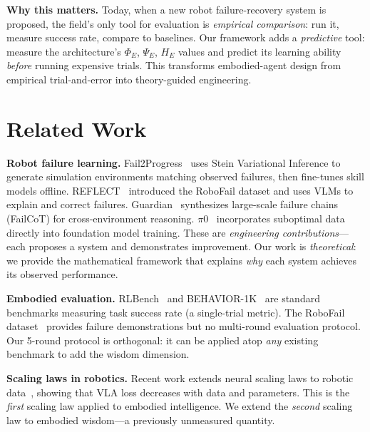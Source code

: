 \documentclass{article}
\begin{document}
\textbf{Why this matters.}
Today, when a new robot failure-recovery system is proposed, the field's only tool for evaluation is \emph{empirical comparison}: run it, measure success rate, compare to baselines.
Our framework adds a \emph{predictive} tool: measure the architecture's $\Phi_E$, $\Psi_E$, $H_E$ values and predict its learning ability \emph{before} running expensive trials.
This transforms embodied-agent design from empirical trial-and-error into theory-guided engineering.

\section{Related Work}
\label{sec:related}

\textbf{Robot failure learning.}
Fail2Progress~\citep{huang2025fail2progress} uses Stein Variational Inference to generate simulation environments matching observed failures, then fine-tunes skill models offline.
REFLECT~\citep{liu2023reflect} introduced the RoboFail dataset and uses VLMs to explain and correct failures.
Guardian~\citep{guardian2026} synthesizes large-scale failure chains (FailCoT) for cross-environment reasoning.
$\pi$0~\citep{pi07_2026} incorporates suboptimal data directly into foundation model training.
These are \emph{engineering contributions}---each proposes a system and demonstrates improvement.
Our work is \emph{theoretical}: we provide the mathematical framework that explains \emph{why} each system achieves its observed performance.

\textbf{Embodied evaluation.}
RLBench~\citep{james2020rlbench} and BEHAVIOR-1K~\citep{li2023behavior} are standard benchmarks measuring task success rate (a single-trial metric).
The RoboFail dataset~\citep{liu2023reflect} provides failure demonstrations but no multi-round evaluation protocol.
Our 5-round protocol is orthogonal: it can be applied atop \emph{any} existing benchmark to add the wisdom dimension.

\textbf{Scaling laws in robotics.}
Recent work extends neural scaling laws to robotic data~\citep{rt2_scaling2024}, showing that VLA loss decreases with data and parameters.
This is the \emph{first} scaling law applied to embodied intelligence.
We extend the \emph{second} scaling law to embodied wisdom---a previously unmeasured quantity.

\end{document}
